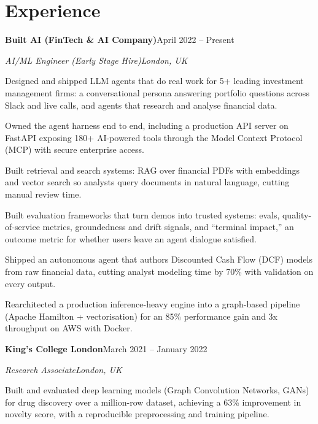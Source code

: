 \documentclass[10pt,a4paper]{article}
\newcommand{\entry}[4]{%
  {\color{company}\bfseries #1}\hfill {\color{muted}#2}\par
  \vspace{1pt}
  {\itshape #3}\hfill {\color{muted}\itshape #4}\par
  \vspace{3pt}%
}
\begin{document}
\section{Experience}
\entry{Built AI (FinTech \& AI Company)}{April 2022 -- Present}{AI/ML Engineer (Early Stage Hire)}{London, UK}
\begin{tight}
  \item Designed and shipped LLM agents that do real work for 5+ leading investment management firms: a conversational persona answering portfolio questions across Slack and live calls, and agents that research and analyse financial data.
  \item Owned the agent harness end to end, including a production API server on FastAPI exposing 180+ AI-powered tools through the Model Context Protocol (MCP) with secure enterprise access.
  \item Built retrieval and search systems: RAG over financial PDFs with embeddings and vector search so analysts query documents in natural language, cutting manual review time.
  \item Built evaluation frameworks that turn demos into trusted systems: evals, quality-of-service metrics, groundedness and drift signals, and ``terminal impact,'' an outcome metric for whether users leave an agent dialogue satisfied.
  \item Shipped an autonomous agent that authors Discounted Cash Flow (DCF) models from raw financial data, cutting analyst modeling time by 70\% with validation on every output.
  \item Rearchitected a production inference-heavy engine into a graph-based pipeline (Apache Hamilton + vectorisation) for an 85\% performance gain and 3x throughput on AWS with Docker.
\end{tight}

\entry{King's College London}{March 2021 -- January 2022}{Research Associate}{London, UK}
\begin{tight}
  \item Built and evaluated deep learning models (Graph Convolution Networks, GANs) for drug discovery over a million-row dataset, achieving a 63\% improvement in novelty score, with a reproducible preprocessing and training pipeline.
\end{tight}

\end{document}
